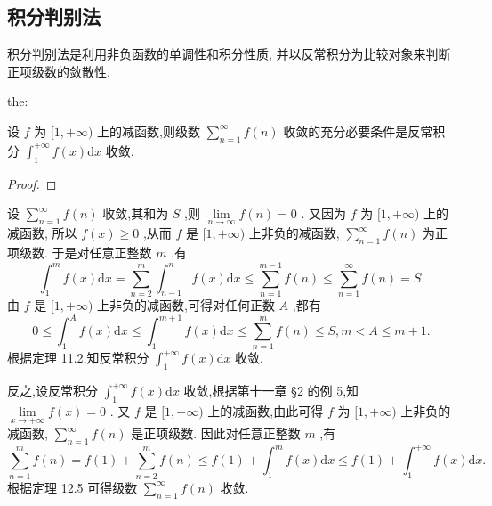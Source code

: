 \subsection{积分判别法}

积分判别法是利用非负函数的单调性和积分性质, 并以反常积分为比较对象来判断正项级数的敛散性.

\begin{theorem}{}{the:}

\end{theorem}
 设 \(f\) 为 \(\lbrack 1, + \infty )\) 上的减函数,则级数 \(\mathop{\sum }\limits_{{n = 1}}^{\infty }f\left( n\right)\) 收敛的充分必要条件是反常积分 \({\int }_{1}^{+\infty }f\left( x\right) \mathrm{d}x\) 收敛.

\begin{proof}

\end{proof}
设 \(\mathop{\sum }\limits_{{n = 1}}^{\infty }f\left( n\right)\) 收敛,其和为 \(S\) ,则 \(\mathop{\lim }\limits_{{n \rightarrow  \infty }}f\left( n\right)  = 0\) . 又因为 \(f\) 为 \(\lbrack 1, + \infty )\) 上的减函数, 所以 \(f\left( x\right)  \geq  0\) ,从而 \(f\) 是 \(\lbrack 1, + \infty )\) 上非负的减函数, \(\mathop{\sum }\limits_{{n = 1}}^{\infty }f\left( n\right)\) 为正项级数. 于是对任意正整数 \(m\) ,有
\[
{\int }_{1}^{m}f\left( x\right) \mathrm{d}x = \mathop{\sum }\limits_{{n = 2}}^{m}{\int }_{n - 1}^{n}f\left( x\right) \mathrm{d}x \leq  \mathop{\sum }\limits_{{n = 1}}^{{m - 1}}f\left( n\right)  \leq  \mathop{\sum }\limits_{{n = 1}}^{\infty }f\left( n\right)  = S.
\]
由 \(f\) 是 \(\lbrack 1, + \infty )\) 上非负的减函数,可得对任何正数 \(A\) ,都有
\[
0 \leq  {\int }_{1}^{A}f\left( x\right) \mathrm{d}x \leq  {\int }_{1}^{m + 1}f\left( x\right) \mathrm{d}x \leq  \mathop{\sum }\limits_{{n = 1}}^{m}f\left( n\right)  \leq  S,m < A \leq  m + 1.
\]
根据定理 11.2,知反常积分 \({\int }_{1}^{+\infty }f\left( x\right) \mathrm{d}x\) 收敛.

反之,设反常积分 \({\int }_{1}^{+\infty }f\left( x\right) \mathrm{d}x\) 收敛,根据第十一章 §2 的例 5,知 \(\mathop{\lim }\limits_{{x \rightarrow   + \infty }}f\left( x\right)  = 0\) . 又 \(f\) 是 \(\lbrack 1, + \infty )\) 上的减函数,由此可得 \(f\) 为 \(\lbrack 1, + \infty )\) 上非负的减函数, \(\mathop{\sum }\limits_{{n = 1}}^{\infty }f\left( n\right)\) 是正项级数. 因此对任意正整数 \(m\) ,有
\[
\mathop{\sum }\limits_{{n = 1}}^{m}f\left( n\right)  = f\left( 1\right)  + \mathop{\sum }\limits_{{n = 2}}^{m}f\left( n\right)  \leq  f\left( 1\right)  + {\int }_{1}^{m}f\left( x\right) \mathrm{d}x \leq  f\left( 1\right)  + {\int }_{1}^{+\infty }f\left( x\right) \mathrm{d}x.
\]
根据定理 12.5 可得级数 \(\mathop{\sum }\limits_{{n = 1}}^{\infty }f\left( n\right)\) 收敛.

